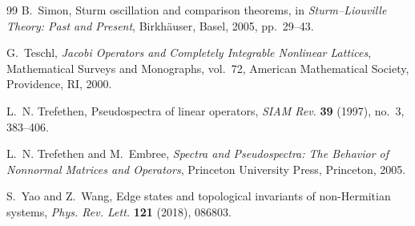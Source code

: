 \documentclass[11pt]{amsart}
\numberwithin{equation}{section}
\begin{document}
\begin{thebibliography}{99}
B.~Simon,
Sturm oscillation and comparison theorems,
in \emph{Sturm--Liouville Theory: Past and Present},
Birkh\"auser, Basel, 2005, pp.~29--43.

G.~Teschl,
\emph{Jacobi Operators and Completely Integrable Nonlinear Lattices},
Mathematical Surveys and Monographs, vol.~72,
American Mathematical Society, Providence, RI, 2000.

L.~N. Trefethen,
Pseudospectra of linear operators,
\emph{SIAM Rev.} \textbf{39} (1997), no.~3, 383--406.

L.~N. Trefethen and M.~Embree,
\emph{Spectra and Pseudospectra: The Behavior of Nonnormal Matrices and Operators},
Princeton University Press, Princeton, 2005.

S.~Yao and Z.~Wang,
Edge states and topological invariants of non-Hermitian systems,
\emph{Phys. Rev. Lett.} \textbf{121} (2018), 086803.

\end{thebibliography}
\end{document}
